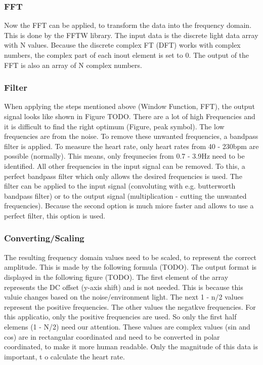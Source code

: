 \documentclass[oneside, notitlepage]{scrreprt}
\begin{document}
\subsubsection{FFT}
Now the FFT can be applied, to transform the data into the frequency domain. This is done by the FFTW library. The input data is the discrete light data array with N values.
Because the discrete complex FT (DFT) works with complex numbers, the complex part of each inout element is set to 0. The output of the FFT is also an array of N complex numbers.

\subsubsection{Filter}
When applying the steps mentioned above (Window Function, FFT), the output signal looks like shown in Figure TODO. There are a lot of high Frequencies and it is difficult to find
the right optimum (Figure, peak symbol). The low frequencies are from the noise. To remove these unwanted frequencies, a bandpass filter is applied. To measure the heart rate, only heart rates from
40 - 230bpm are possible (normally). This means, only frequnecies from 0.7 - 3.9Hz need to be identified. All other frequencies in the input signal can be removed. To this, a perfect bandpass filter
which only allows the desired frequencies is used. The filter can be applied to the input signal (convoluting with e.g. butterworth bandpass filter) or to the output signal (multiplication - cutting the unwanted frequencies). Because the second option is much miore faster and allows to use a perfect filter, this option is used.

\subsubsection{Converting/Scaling}
The resulting frequency domain values need to be scaled, to represent the correct amplitude. This is made by the following formula (TODO).
The output format is displayed in the following figure (TODO). The first element of the array represents the DC offset (y-axis shift) and is not needed.
This is because this valuie changes based on the noise/environment light. The next 1 - n/2 values represent the positive frequencies. The other values the negatkve frequencies.
For this applicatio, only the positive frequencies are used. So only the first half elemens (1 - N/2) need our attention. These values are complex values (sin and cos) are in rectangular coordinated and need to be converted in polar coordinated, to make it more human readable. Only the magnitude of this data is important, t o calculate the heart rate.
\end{document}
